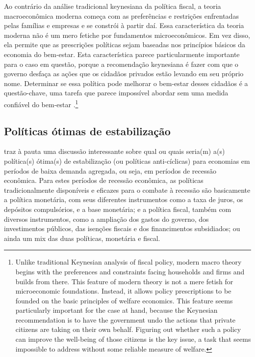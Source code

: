 \documentclass[
	10pt,				%
	openright,			%
	twoside,			%
	a5paper,			%
	english,			%
	french,				%
	spanish,			%
	brazil				%
	]{abntex2}
\renewenvironment{quote}
  {\small\list{}{\rightmargin=0.1cm \leftmargin=4cm}%
   \item\relax}
  {\endlist}
\begin{document}
\begin{quote}
Ao contrário da análise tradicional keynesiana da política fiscal, a
teoria macroeconômica moderna começa com as preferências e restrições
enfrentadas pelas famílias e empresas e se constrói à partir daí. Essa
característica da teoria moderna não é um mero fetiche por fundamentos
microeconômicos. Em vez disso, ela permite que as prescrições políticas
sejam baseadas nos princípios básicos da economia do bem-estar. Esta
característica parece particularmente importante para o caso em questão,
porque a recomendação keynesiana é fazer com que o governo desfaça as
ações que os cidadãos privados estão levando em seu próprio nome.
Determinar se essa política pode melhorar o bem-estar desses cidadãos é
a questão-chave, uma tarefa que parece impossível abordar sem uma medida
confiável do bem-estar \cite[p.~2-3]{mankiw2011}.\footnote{Unlike
  traditional Keynesian analysis of fiscal policy, modern macro theory
  begins with the preferences and constraints facing households and
  firms and builds from there. This feature of modern theory is not a
  mere fetish for microeconomic foundations. Instead, it allows policy
  prescriptions to be founded on the basic principles of welfare
  economics. This feature seems particularly important for the case at
  hand, because the Keynesian recommendation is to have the government
  undo the actions that private citizens are taking on their own behalf.
  Figuring out whether such a policy can improve the well-being of those
  citizens is the key issue, a task that seems impossible to address
  without some reliable measure of welfare.}
\end{quote}

\subsection{Políticas ótimas de
estabilização}\label{poluxedticas-uxf3timas-de-estabilizauxe7uxe3o}

 traz à pauta uma discussão interessante sobre
qual ou quais seria(m) a(s) política(s) ótima(s) de estabilização (ou
políticas anti-cíclicas) para economias em períodos de baixa demanda
agregada, ou seja, em períodos de recessão econômica. Para estes
períodos de recessão econômica, as políticas tradicionalmente
disponíveis e eficazes para o combate à recessão são basicamente a
política monetária, com seus diferentes instrumentos como a taxa de
juros, os depósitos compulsórios, e a base monetária; e a política
fiscal, também com diversos instrumentos, como a ampliação dos gastos do
governo, dos investimentos públicos, das isenções fiscais e dos
financimentos subsidiados; ou ainda um mix das duas políticas, monetária
e fiscal.
\end{document}
